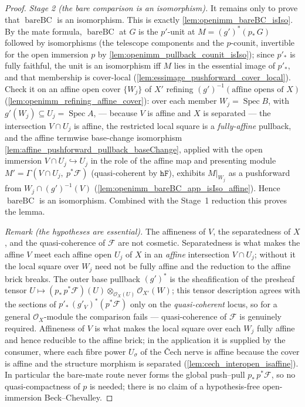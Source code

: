 \begin{proof}
  \emph{Stage 2 (the bare comparison is an isomorphism).} It remains only to prove that
  \(\operatorname{bareBC}\) is an isomorphism. This is exactly \cref{lem:openimm_bareBC_isIso}.
  By the mate formula, \(\operatorname{bareBC}\) at \(G\) is the \(p'\)-unit at
  \(M = (g')^*(p_*\,G)\) followed by isomorphisms (the telescope components and the \(p\)-counit,
  invertible for the open immersion \(p\) by \cref{lem:openimm_pullback_counit_isIso}); since
  \(p'_*\) is fully faithful, the unit is an isomorphism iff \(M\) lies in the essential image of
  \(p'_*\), and that membership is cover-local (\cref{lem:essimage_pushforward_cover_local}).
  Check it on an affine open cover \(\{W_j\}\) of \(X'\) refining
  \((g')^{-1}(\text{affine opens of } X)\) (\cref{lem:openimm_refining_affine_cover}): over each
  member \(W_j = \operatorname{Spec} B\), with \(g'(W_j) \subseteq U_j = \operatorname{Spec} A\),
  --- because \(V\) is affine and \(X\) is separated --- the intersection \(V \cap U_j\) is
  affine, the restricted local square is a \emph{fully-affine} pullback, and the
  affine termwise base-change isomorphism \cref{lem:affine_pushforward_pullback_baseChange},
  applied with the open immersion \(V \cap U_j \hookrightarrow U_j\) in the role of the affine
  map and presenting module \(M' = \Gamma(V \cap U_j,\ p^*\mathcal{F})\) (quasi-coherent by
  \(\mathtt{hF}\)), exhibits \(M|_{W_j}\) as a pushforward from \(W_j \cap (g')^{-1}(V)\)
  (\cref{lem:openimm_bareBC_app_isIso_affine}). Hence \(\operatorname{bareBC}\) is an
  isomorphism. Combined with the Stage~1 reduction this proves the lemma.

  \emph{Remark (the hypotheses are essential).} The affineness of \(V\), the separatedness of
  \(X\), and the quasi-coherence of \(\mathcal{F}\) are not cosmetic. Separatedness is what makes
  the affine \(V\) meet each affine open \(U_j\) of \(X\) in an \emph{affine} intersection
  \(V \cap U_j\); without it the local square over \(W_j\) need not be fully affine and the
  reduction to the affine brick breaks. The outer base pullback \((g')^*\) is the sheafification
  of the presheaf tensor \(U \mapsto (p_*\,p^*\mathcal{F})(U) \otimes_{\mathcal{O}_X(U)}
  \mathcal{O}_{X'}(W)\); this tensor description agrees with the sections of
  \(p'_*\,(g'_V)^*(p^*\mathcal{F})\) only on the \emph{quasi-coherent} locus, so for a general
  \(\mathcal{O}_X\)-module the comparison fails --- quasi-coherence of \(\mathcal{F}\) is genuinely
  required. Affineness of \(V\) is what makes the local square over each \(W_j\) fully affine and
  hence reducible to the affine brick; in the application it is supplied by the consumer, where
  each fibre power \(U_\sigma\) of the {\v C}ech nerve is affine because the cover is affine and
  the structure morphism is separated (\cref{lem:cech_interopen_isaffine}). In particular the
  bare-mate route never forms the global push--pull \(p_*\,p^*\mathcal{F}\), so no
  quasi-compactness of \(p\) is needed; there is no claim of a hypothesis-free open-immersion
  Beck--Chevalley.
\end{proof}

